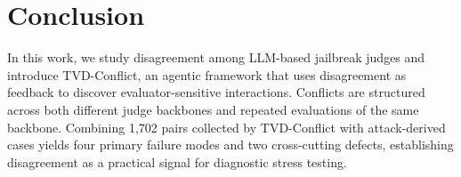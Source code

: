 \section{Conclusion}

In this work, we study disagreement among LLM-based jailbreak judges and
introduce \textsc{TVD}-Conflict, an agentic framework that uses disagreement as
feedback to discover evaluator-sensitive interactions. Conflicts are
structured across both different judge backbones and repeated evaluations of
the same backbone. Combining 1,702 pairs collected by \textsc{TVD}-Conflict
with attack-derived cases yields four primary failure modes and two
cross-cutting defects, establishing disagreement as a practical signal for
diagnostic stress testing.
